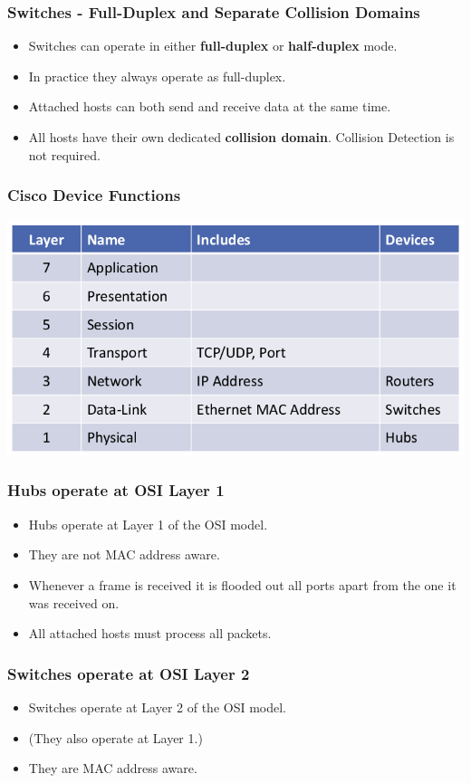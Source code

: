 \documentclass[pdflatex,compress,mathserif]{beamer}
\begin{document}
\begin{frame}
	\frametitle{Switches - Full-Duplex and Separate Collision Domains}
	\begin{itemize}
		\item Switches can operate in either \textbf{full-duplex} or \textbf{half-duplex} mode.
		\item In practice they always operate as full-duplex.
		\item Attached hosts can both send and receive data at the same time.
		\item All hosts have their own dedicated \textbf{collision domain}.
		Collision Detection is not required.
	\end{itemize}
\end{frame}

\begin{frame}
	\frametitle{Cisco Device Functions}
	\begin{center}
		\includegraphics[width=0.7\linewidth]{img/img03}
	\end{center}
\end{frame}

\begin{frame}
	\frametitle{Hubs operate at OSI Layer 1}
	\begin{itemize}
		\item Hubs operate at Layer 1 of the OSI model.
		\item They are not MAC address aware.
		\item Whenever a frame is received it is flooded out all ports apart from the one it was received on.
		\item All attached hosts must process all packets.
	\end{itemize}
\end{frame}

\begin{frame}
	\frametitle{Switches operate at OSI Layer 2}
	\begin{itemize}
		\item Switches operate at Layer 2 of the OSI model.
		\item (They also operate at Layer 1.)
		\item They are MAC address aware.
	\end{itemize}
\end{frame}
\end{document}

